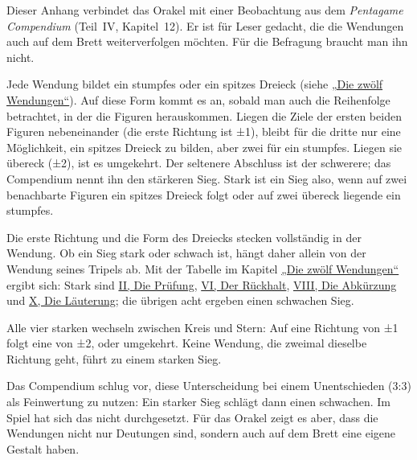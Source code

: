 
\label{kap:anhang}

\begin{einleitung}
Dieser Anhang verbindet das Orakel mit einer Beobachtung aus dem \textit{Pentagame Compendium} (Teil~IV, Kapitel~12). Er ist für Leser gedacht, die die Wendungen auch auf dem Brett weiterverfolgen möchten. Für die Befragung braucht man ihn nicht.
\end{einleitung}


\begin{einleitung}
Jede Wendung bildet ein stumpfes oder ein spitzes Dreieck (siehe \hyperref[kap:muster]{„Die zwölf Wendungen“}). Auf diese Form kommt es an, sobald man auch die Reihenfolge betrachtet, in der die Figuren herauskommen. Liegen die Ziele der ersten beiden Figuren nebeneinander (die erste Richtung ist ±1), bleibt für die dritte nur eine Möglichkeit, ein spitzes Dreieck zu bilden, aber zwei für ein stumpfes. Liegen sie übereck (±2), ist es umgekehrt. Der seltenere Abschluss ist der schwerere; das Compendium nennt ihn den stärkeren Sieg. Stark ist ein Sieg also, wenn auf zwei benachbarte Figuren ein spitzes Dreieck folgt oder auf zwei übereck liegende ein stumpfes.

Die erste Richtung und die Form des Dreiecks stecken vollständig in der Wendung. Ob ein Sieg stark oder schwach ist, hängt daher allein von der Wendung seines Tripels ab. Mit der Tabelle im Kapitel \hyperref[kap:muster]{„Die zwölf Wendungen“} ergibt sich: Stark sind \hyperlink{muster:II}{II, Die Prüfung}, \hyperlink{muster:VI}{VI, Der Rückhalt}, \hyperlink{muster:VIII}{VIII, Die Abkürzung} und \hyperlink{muster:X}{X, Die Läuterung}; die übrigen acht ergeben einen schwachen Sieg.

Alle vier starken wechseln zwischen Kreis und Stern: Auf eine Richtung von ±1 folgt eine von ±2, oder umgekehrt. Keine Wendung, die zweimal dieselbe Richtung geht, führt zu einem starken Sieg.

Das Compendium schlug vor, diese Unterscheidung bei einem Unentschieden (3:3) als Feinwertung zu nutzen: Ein starker Sieg schlägt dann einen schwachen. Im Spiel hat sich das nicht durchgesetzt. Für das Orakel zeigt es aber, dass die Wendungen nicht nur Deutungen sind, sondern auch auf dem Brett eine eigene Gestalt haben.
\end{einleitung}